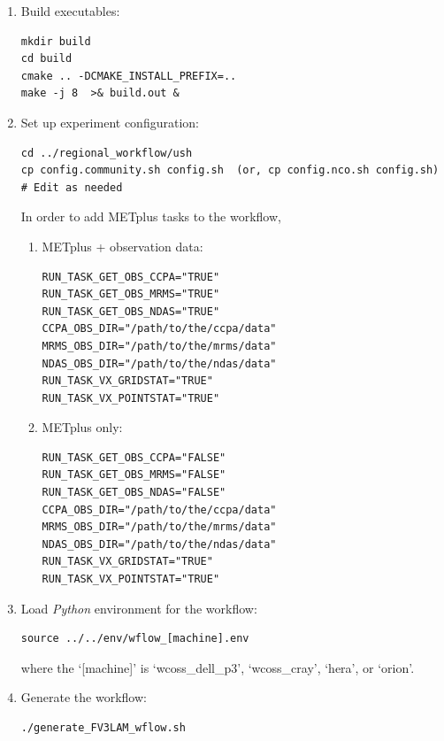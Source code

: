 \documentclass[11pt,fleqn]{report}              %
\begin{document}
\begin{enumerate}
\vspace{0.2cm}

\item Build executables:
\lstset{language=bash}   
\begin{lstlisting}[frame=trBL]
mkdir build
cd build
cmake .. -DCMAKE_INSTALL_PREFIX=..
make -j 8  >& build.out &
\end{lstlisting}

\item Set up experiment configuration:
\lstset{language=bash}   
\begin{lstlisting}[frame=trBL]
cd ../regional_workflow/ush
cp config.community.sh config.sh  (or, cp config.nco.sh config.sh)
# Edit as needed
\end{lstlisting}

In order to add METplus tasks to the workflow,
\begin{enumerate}
\item METplus + observation data:
\lstset{language=bash}   
\begin{lstlisting}[frame=trBL]
RUN_TASK_GET_OBS_CCPA="TRUE"
RUN_TASK_GET_OBS_MRMS="TRUE"
RUN_TASK_GET_OBS_NDAS="TRUE"
CCPA_OBS_DIR="/path/to/the/ccpa/data"
MRMS_OBS_DIR="/path/to/the/mrms/data"
NDAS_OBS_DIR="/path/to/the/ndas/data"
RUN_TASK_VX_GRIDSTAT="TRUE"
RUN_TASK_VX_POINTSTAT="TRUE"
\end{lstlisting}

\item METplus only:
\lstset{language=bash}   
\begin{lstlisting}[frame=trBL]
RUN_TASK_GET_OBS_CCPA="FALSE"
RUN_TASK_GET_OBS_MRMS="FALSE"
RUN_TASK_GET_OBS_NDAS="FALSE"
CCPA_OBS_DIR="/path/to/the/ccpa/data"
MRMS_OBS_DIR="/path/to/the/mrms/data"
NDAS_OBS_DIR="/path/to/the/ndas/data"
RUN_TASK_VX_GRIDSTAT="TRUE"
RUN_TASK_VX_POINTSTAT="TRUE"
\end{lstlisting}

\end{enumerate}


\item Load {\it Python} environment for the workflow:
\lstset{language=bash}   
\begin{lstlisting}[frame=trBL]
source ../../env/wflow_[machine].env
\end{lstlisting}
where the `[machine]' is `wcoss\_dell\_p3', `wcoss\_cray', `hera', or `orion'. 

\vspace{0.2cm}

\item Generate the workflow:
\lstset{language=bash}   
\begin{lstlisting}[frame=trBL]
./generate_FV3LAM_wflow.sh
\end{lstlisting}


\end{enumerate}
\end{document}
